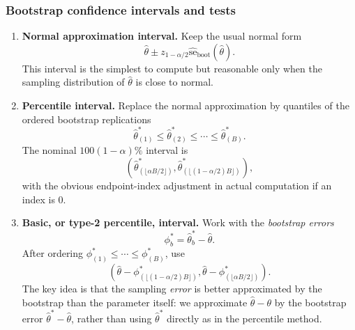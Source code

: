 \subsubsection{Bootstrap confidence intervals and tests}
\begin{enumerate}
    \item \textbf{Normal approximation interval.}
    Keep the usual normal form
    \[
        \hat\theta
        \pm
        z_{1-\alpha/2}\widehat{\mathrm{se}}_{\mathrm{boot}}(\hat\theta).
    \]
    This interval is the simplest to compute but reasonable only when the sampling distribution of $\hat\theta$ is close to normal.

    \item \textbf{Percentile interval.}
    Replace the normal approximation by quantiles of the ordered bootstrap replications
    \[
        \hat\theta_{(1)}^* \le \hat\theta_{(2)}^* \le \cdots \le \hat\theta_{(B)}^*.
    \]
    The nominal $100(1-\alpha)\%$ interval is
    \[
        \left(
            \hat\theta^*_{(\lfloor \alpha B/2\rfloor)},
            \hat\theta^*_{(\lfloor (1-\alpha/2)B\rfloor)}
        \right),
    \]
    with the obvious endpoint-index adjustment in actual computation if an index is $0$.

    \item \textbf{Basic, or type-2 percentile, interval.}
    Work with the \emph{bootstrap errors}
    \[
        \phi_b^*=\hat\theta_b^*-\hat\theta.
    \]
    After ordering $\phi_{(1)}^*\le\cdots\le\phi_{(B)}^*$, use
    \[
        \left(
            \hat\theta-\phi^*_{(\lfloor (1-\alpha/2)B\rfloor)},
            \hat\theta-\phi^*_{(\lfloor \alpha B/2\rfloor)}
        \right).
    \]
    The key idea is that the sampling \emph{error} is better approximated by the bootstrap than the parameter itself: we approximate $\hat\theta-\theta$ by the bootstrap error $\hat\theta^*-\hat\theta$, rather than using $\hat\theta^*$ directly as in the percentile method.
    

\end{enumerate}
